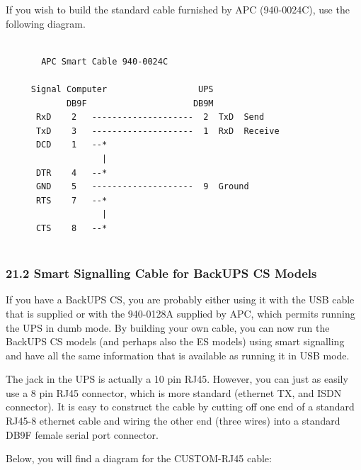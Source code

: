 If you wish to build the standard cable furnished by APC (940-0024C), use the
following diagram. 

\footnotesize
\begin{verbatim}
     
       APC Smart Cable 940-0024C
     
     Signal Computer                  UPS
            DB9F                     DB9M
      RxD    2   --------------------  2  TxD  Send
      TxD    3   --------------------  1  RxD  Receive
      DCD    1   --*
                   |
      DTR    4   --*
      GND    5   --------------------  9  Ground
      RTS    7   --*
                   |
      CTS    8   --*
     
\end{verbatim}
\normalsize

\label{Smart-Signalling-Cable-for-BackUPS-CS-Models}

\subsubsection*{21.2 Smart Signalling Cable for BackUPS CS Models}

\label{index-Cables_002c-Smart-Signalling-194}
\label{index-Cables_002c-BackUPS-CS-195}
If you have a BackUPS CS, you are probably either using it with the USB cable
that is supplied or with the 940-0128A supplied by APC, which permits running
the UPS in dumb mode. By building your own cable, you can now run the BackUPS
CS models (and perhaps also the ES models) using smart signalling and have all
the same information that is available as running it in USB mode.  

The jack in the UPS is actually a 10 pin RJ45. However, you can just as easily
use a 8 pin RJ45 connector, which is more standard (ethernet TX, and ISDN
connector). It is easy to construct the cable by cutting off one end of a
standard RJ45-8 ethernet cable and wiring the other end (three wires) into a
standard DB9F female serial port connector.  

Below, you will find a diagram for the CUSTOM-RJ45 cable: 

